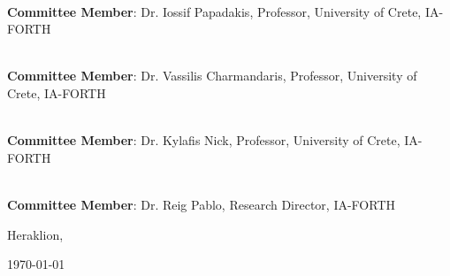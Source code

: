 \documentclass[main.tex]{subfiles}
\begin{document}
    \noindent\hrulefill \\
    \noindent\textbf{Committee Member}: Dr. Iossif Papadakis, Professor, University of Crete, IA-FORTH \\
    \vspace*{0.5cm}  
    
    \noindent\hrulefill \\
    \noindent\textbf{Committee Member}: Dr. Vassilis Charmandaris, Professor, University of Crete, IA-FORTH \\
    \vspace*{0.5cm}    

    \noindent\hrulefill \\
    \noindent\textbf{Committee Member}: Dr. Kylafis Nick, Professor, University of Crete, IA-FORTH \\
    \vspace*{0.5cm}  

    \noindent\hrulefill \\
    \noindent\textbf{Committee Member}: Dr. Reig Pablo, Research Director, IA-FORTH \\
    \vspace*{0.5cm}  
    
    
    \begin{center}
        \vspace*{\fill}
        Heraklion, \date{}{\today}
    \end{center}
\end{document}
